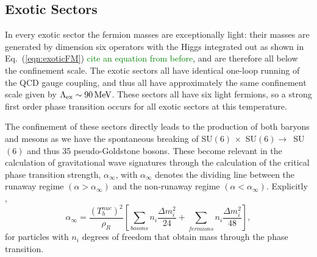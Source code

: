 \documentclass[nofootinbib,twocolumn,preprintnumbers]{revtex4-1}
\begin{document}
\subsection{Exotic Sectors}

In every exotic sector the fermion masses are exceptionally light: their masses are generated by dimension six operators with the Higgs integrated out as shown in Eq.~(\ref{eqn:exoticFM}) \textcolor{green}{cite an equation from before}, and are therefore all below the confinement scale. The exotic sectors all have identical one-loop running of the QCD gauge coupling, and thus all have approximately the same confinement scale given by $\Lambda_{\rm ex} \sim 90 \,\mathrm{MeV}$. These sectors all have six light fermions, so a strong first order phase transition occurs for all exotic sectors at this temperature. 

The confinement of these sectors directly leads to the production of both baryons and mesons as we have the spontaneous breaking of SU$(6) \,\times$ SU$(6) \rightarrow\,$ SU$(6)$ and thus 35 pseudo-Goldstone bosons. These become relevant in the calculation of gravitational wave signatures through the calculation of the critical phase transition strength, $\alpha_{\infty}$, with $\alpha_{\infty}$ denotes the dividing line between the runaway regime  $(\alpha >\alpha_{\infty})$ and the non-runaway regime $(\alpha <\alpha_{\infty})$. Explicitly \cite{Breitbach:2018ddu, Caprini:2015zlo, Espinosa:2010hh}, 
\begin{equation}\label{eqn:critPTstrength}
\alpha_{\infty} = \frac{(T^{nuc}_h)^2}{\rho_R}\left[\sum_{bosons} n_i\frac{\Delta m^2_i}{24} + \sum_{fermions} n_i\frac{\Delta m_i^2}{48}\right],
\end{equation} 
for particles with $n_i$ degrees of freedom that obtain mass through the phase transition. 
\end{document}
